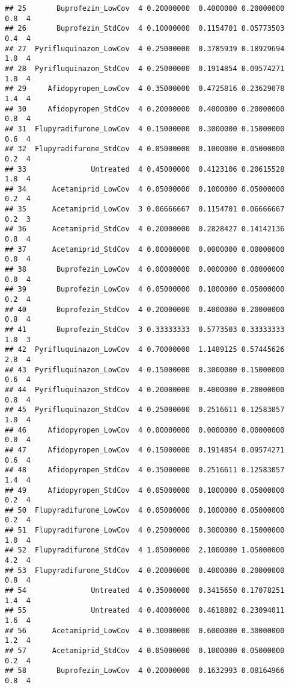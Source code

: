 \documentclass[
]{article}
\begin{document}
\begin{verbatim}
## 25       Buprofezin_LowCov  4 0.20000000  0.4000000 0.20000000      0.8  4
## 26       Buprofezin_StdCov  4 0.10000000  0.1154701 0.05773503      0.4  4
## 27  Pyrifluquinazon_LowCov  4 0.25000000  0.3785939 0.18929694      1.0  4
## 28  Pyrifluquinazon_StdCov  4 0.25000000  0.1914854 0.09574271      1.0  4
## 29     Afidopyropen_LowCov  4 0.35000000  0.4725816 0.23629078      1.4  4
## 30     Afidopyropen_StdCov  4 0.20000000  0.4000000 0.20000000      0.8  4
## 31  Flupyradifurone_LowCov  4 0.15000000  0.3000000 0.15000000      0.6  4
## 32  Flupyradifurone_StdCov  4 0.05000000  0.1000000 0.05000000      0.2  4
## 33               Untreated  4 0.45000000  0.4123106 0.20615528      1.8  4
## 34      Acetamiprid_LowCov  4 0.05000000  0.1000000 0.05000000      0.2  4
## 35      Acetamiprid_LowCov  3 0.06666667  0.1154701 0.06666667      0.2  3
## 36      Acetamiprid_StdCov  4 0.20000000  0.2828427 0.14142136      0.8  4
## 37      Acetamiprid_StdCov  4 0.00000000  0.0000000 0.00000000      0.0  4
## 38       Buprofezin_LowCov  4 0.00000000  0.0000000 0.00000000      0.0  4
## 39       Buprofezin_LowCov  4 0.05000000  0.1000000 0.05000000      0.2  4
## 40       Buprofezin_StdCov  4 0.20000000  0.4000000 0.20000000      0.8  4
## 41       Buprofezin_StdCov  3 0.33333333  0.5773503 0.33333333      1.0  3
## 42  Pyrifluquinazon_LowCov  4 0.70000000  1.1489125 0.57445626      2.8  4
## 43  Pyrifluquinazon_LowCov  4 0.15000000  0.3000000 0.15000000      0.6  4
## 44  Pyrifluquinazon_StdCov  4 0.20000000  0.4000000 0.20000000      0.8  4
## 45  Pyrifluquinazon_StdCov  4 0.25000000  0.2516611 0.12583057      1.0  4
## 46     Afidopyropen_LowCov  4 0.00000000  0.0000000 0.00000000      0.0  4
## 47     Afidopyropen_LowCov  4 0.15000000  0.1914854 0.09574271      0.6  4
## 48     Afidopyropen_StdCov  4 0.35000000  0.2516611 0.12583057      1.4  4
## 49     Afidopyropen_StdCov  4 0.05000000  0.1000000 0.05000000      0.2  4
## 50  Flupyradifurone_LowCov  4 0.05000000  0.1000000 0.05000000      0.2  4
## 51  Flupyradifurone_LowCov  4 0.25000000  0.3000000 0.15000000      1.0  4
## 52  Flupyradifurone_StdCov  4 1.05000000  2.1000000 1.05000000      4.2  4
## 53  Flupyradifurone_StdCov  4 0.20000000  0.4000000 0.20000000      0.8  4
## 54               Untreated  4 0.35000000  0.3415650 0.17078251      1.4  4
## 55               Untreated  4 0.40000000  0.4618802 0.23094011      1.6  4
## 56      Acetamiprid_LowCov  4 0.30000000  0.6000000 0.30000000      1.2  4
## 57      Acetamiprid_StdCov  4 0.05000000  0.1000000 0.05000000      0.2  4
## 58       Buprofezin_LowCov  4 0.20000000  0.1632993 0.08164966      0.8  4

\end{verbatim}
\end{document}

